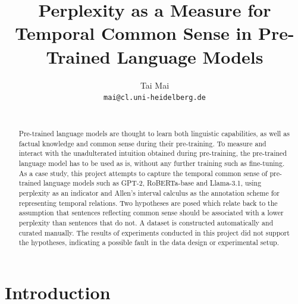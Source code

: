 \documentclass[11pt]{article}
\title{Perplexity as a Measure for Temporal Common Sense in Pre-Trained Language Models}
\author{Tai Mai \\
  \texttt{mai@cl.uni-heidelberg.de} \\
  \\}
\begin{document}
\maketitle
\begin{abstract}
  Pre-trained language models are thought to learn both linguistic capabilities, as well as factual knowledge and common sense during their pre-training. To measure and interact with the unadulterated intuition obtained during pre-training, the pre-trained language model has to be used as is, without any further training such as fine-tuning. As a case study, this project attempts to capture the temporal common sense of pre-trained language models such as GPT-2, RoBERTa-base and Llama-3.1, using perplexity as an indicator and Allen's interval calculus as the annotation scheme for representing temporal relations. Two hypotheses are posed which relate back to the assumption that sentences reflecting common sense should be associated with a lower perplexity than sentences that do not. A dataset is constructed automatically and curated manually. The results of experiments conducted in this project did not support the hypotheses, indicating a possible fault in the data design or experimental setup.
\end{abstract}

\section{Introduction}
\end{document}
